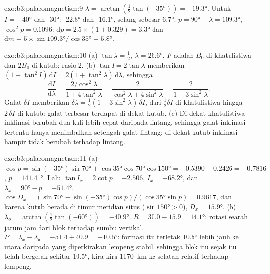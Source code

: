 \begin{solution}{exo:b3:palaeomagnetism:9}
$\lambda = \arctan(\tfrac12\tan(\ang{-35})) = \ang{-19.3}$. Untuk $I = \ang{-40}$
dan \ang{-30}: \ang{-22.8} dan \ang{-16.1}, selang sebesar \ang{6.7}.
$p = \ang{90} - \lambda = \ang{109.3}$, $\cos^2p = 0.1096$:
$\mathrm dp = 2.5\times(1 + 0.329) = \ang{3.3}$ dan $\mathrm dm =
5\times\sin\ang{109.3}/\cos\ang{35} = \ang{5.8}$.
\end{solution}

\begin{solution}{exo:b3:palaeomagnetism:10}
(a) $\tan\lambda = \tfrac12$, $\lambda = \ang{26.6}$. $F$ adalah $B_0$ di
khatulistiwa dan $2B_0$ di kutub: rasio 2. (b) $\tan I = 2\tan\lambda$
memberikan $(1 + \tan^2I)\,\mathrm dI = 2(1 + \tan^2\lambda)\,\mathrm d\lambda$, sehingga
\[
  \frac{\mathrm dI}{\mathrm d\lambda} = \frac{2/\cos^2\lambda}{1 + 4\tan^2\lambda}
  = \frac{2}{\cos^2\lambda + 4\sin^2\lambda} = \frac{2}{1 + 3\sin^2\lambda}.
\]
Galat $\delta I$ memberikan $\delta\lambda = \tfrac12(1 + 3\sin^2\lambda)\,\delta I$,
dari $\tfrac12\delta I$ di khatulistiwa hingga $2\,\delta I$ di kutub: galat
terbesar terdapat di dekat kutub. (c) Di dekat khatulistiwa inklinasi berubah
dua kali lebih cepat daripada lintang, sehingga galat inklinasi tertentu hanya menimbulkan setengah
galat lintang; di dekat kutub inklinasi hampir tidak berubah terhadap lintang.
\end{solution}

\begin{solution}{exo:b3:palaeomagnetism:11}
(a) $\cos p = \sin(\ang{-35})\sin\ang{70} + \cos\ang{35}\cos\ang{70}\cos\ang{150}
= -0.5390 - 0.2426 = -0.7816$, $p = \ang{141.41}$. Lalu $\tan I_x = 2\cot p =
-2.506$, $I_x = \ang{-68.2}$, dan $\lambda_x = \ang{90} - p = \ang{-51.4}$.
$\cos D_x = (\sin\ang{70} - \sin(\ang{-35})\cos p)/(\cos\ang{35}\sin p) =
0.9617$, dan karena kutub berada di timur meridian situs ($\sin\ang{150} >
0$), $D_x = \ang{15.9}$. (b) $\lambda_o = \arctan(\tfrac12\tan(\ang{-60})) =
\ang{-40.9}$. $R = 30.0 - 15.9 = \ang{14.1}$: rotasi searah jarum jam dari blok
terhadap sumbu vertikal. $P = \lambda_x - \lambda_o = -51.4 + 40.9 =
\ang{-10.5}$: formasi itu terletak \ang{10.5} lebih jauh ke utara daripada yang
diperkirakan lempeng stabil, sehingga blok itu sejak itu telah bergerak sekitar \ang{10.5},
kira-kira \qty{1170}{km} ke selatan relatif terhadap lempeng.
\end{solution}

